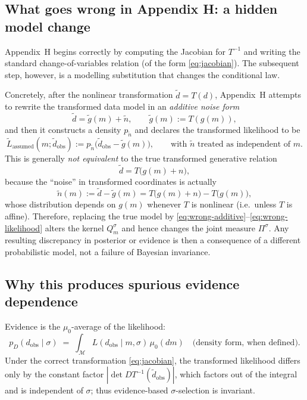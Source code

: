\documentclass[11pt]{article}
\theoremstyle{remark}
\newcommand{\modelspace}{\mathcal{M}}
\begin{document}
\subsection{What goes wrong in Appendix H: a hidden model change}

Appendix~H begins correctly by computing the Jacobian for \(T^{-1}\) and writing the standard
change-of-variables relation (of the form \eqref{eq:jacobian}). The subsequent step, however,
is a modelling substitution that changes the conditional law.

Concretely, after the nonlinear transformation \(\tilde d=T(d)\), Appendix~H attempts to rewrite the
transformed data model in an \emph{additive noise form}
\begin{equation}\label{eq:wrong-additive}
\tilde d = \tilde g(m) + \tilde n,
\qquad \tilde g(m):=T(g(m)),
\end{equation}
and then it constructs a density \(p_{\tilde n}\) and declares the transformed likelihood to be
\begin{equation}\label{eq:wrong-likelihood}
\tilde L_{\mathrm{assumed}}(m;\tilde d_{\mathrm{obs}})
:= p_{\tilde n}\bigl(\tilde d_{\mathrm{obs}}-\tilde g(m)\bigr),
\qquad\text{with }\tilde n \text{ treated as independent of } m.
\end{equation}
This is generally \emph{not equivalent} to the true transformed generative relation
\[
\tilde d = T\bigl(g(m)+n\bigr),
\]
because the ``noise'' in transformed coordinates is actually
\[
\tilde n(m) := \tilde d-\tilde g(m)
= T\bigl(g(m)+n\bigr)-T\bigl(g(m)\bigr),
\]
whose distribution depends on \(g(m)\) whenever \(T\) is nonlinear (i.e.\ unless \(T\) is affine).
Therefore, replacing the true model by \eqref{eq:wrong-additive}--\eqref{eq:wrong-likelihood} alters
the kernel \(Q_m^\sigma\) and hence changes the joint measure \(\Pi^\sigma\). Any resulting discrepancy
in posterior or evidence is then a consequence of a different probabilistic model, not a failure of
Bayesian invariance.

\subsection{Why this produces spurious evidence dependence}

Evidence is the \(\mu_0\)-average of the likelihood:
\[
p_D(d_{\mathrm{obs}}\mid\sigma) \;=\; \int_{\modelspace} L(d_{\mathrm{obs}}\mid m,\sigma)\,\mu_0(dm)
\quad\text{(density form, when defined).}
\]
Under the correct transformation \eqref{eq:jacobian}, the transformed likelihood differs only by the
constant factor \(|\det DT^{-1}(\tilde d_{\mathrm{obs}})|\), which factors out of the integral and is
independent of \(\sigma\); thus evidence-based \(\sigma\)-selection is invariant.
\end{document}
